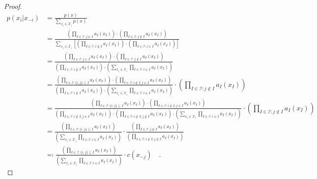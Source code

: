 \documentclass{article}
\theoremstyle{plain}
\begin{document}
\begin{proof}
    \begin{align*}
        p(x_i | x_{-i}) &= \frac{p(x)}{\sum\limits_{x_i \in \mathcal{X}_i}p(x)} \\
        &= \frac{\left(\prod\limits_{I \in \mathcal{I}: j \in I} a_I(x_I)\right) \cdot \left(\prod\limits_{I \in \mathcal{I}: j \not\in I} a_I(x_I)\right)}{\sum\limits_{x_i \in \mathcal{X}_i} \left[\left(\prod\limits_{I \in \mathcal{I}: i \not\in I} a_I(x_I)\right) \cdot \left(\prod\limits_{I \in \mathcal{I}: i \in I} a_I(x_I)\right)\right]} \\
        &= \frac{\left(\prod\limits_{I \in \mathcal{I}: j \in I} a_I(x_I)\right) \cdot \left(\prod\limits_{I \in \mathcal{I}: j \not\in I} a_I(x_I)\right)}{\left(\prod\limits_{I \in \mathcal{I}: i \not\in I} a_I(x_I)\right) \cdot \left(\sum\limits_{x_i \in \mathcal{X}_i}\prod\limits_{I \in \mathcal{I}: i \in I} a_I(x_I)\right)} \\
        &= \frac{\left(\prod\limits_{I \in \mathcal{I}: \{i,j\} \subseteq I} a_I(x_I)\right) \cdot \left(\prod\limits_{I \in \mathcal{I}: i \not\in I, j \in I} a_I(x_I)\right)}{\left(\prod\limits_{I \in \mathcal{I}: i \not\in I} a_I(x_I)\right) \cdot \left(\sum\limits_{x_i \in \mathcal{X}_i}\prod\limits_{I \in \mathcal{I}: i \in I} a_I(x_I)\right)} \cdot \left(\prod\limits_{I \in \mathcal{I}: j \not\in I} a_I(x_I)\right) \\
        &= \frac{\left(\prod\limits_{I \in \mathcal{I}: \{i,j\} \subseteq I} a_I(x_I)\right) \cdot \left(\prod\limits_{I \in \mathcal{I}: i \not\in I, j \in I} a_I(x_I)\right)}{\left(\prod\limits_{I \in \mathcal{I}: i \not\in I, j \in I} a_I(x_I)\right) \cdot \left(\prod\limits_{I \in \mathcal{I}: i \not\in I, j \not\in I} a_I(x_I)\right) \cdot \left(\sum\limits_{x_i \in \mathcal{X}_i}\prod\limits_{I \in \mathcal{I}: i \in I} a_I(x_I)\right)} \cdot \left(\prod\limits_{I \in \mathcal{I}: j \not\in I} a_I(x_I)\right) \\
        &= \frac{\left(\prod\limits_{I \in \mathcal{I}: \{i,j\} \subseteq I} a_I(x_I)\right)}{\left(\sum\limits_{x_i \in \mathcal{X}_i}\prod\limits_{I \in \mathcal{I}: i \in I} a_I(x_I)\right)} \cdot \frac{\left(\prod\limits_{I \in \mathcal{I}: j \not\in I} a_I(x_I)\right)}{\left(\prod\limits_{I \in \mathcal{I}: i \not\in I, j \not\in I} a_I(x_I)\right)} \\
        &\eqqcolon \frac{\left(\prod\limits_{I \in \mathcal{I}: \{i,j\} \subseteq I} a_I(x_I)\right)}{\left(\sum\limits_{x_i \in \mathcal{X}_i}\prod\limits_{I \in \mathcal{I}: i \in I} a_I(x_I)\right)} \cdot c(x_{-j}) \quad .
    \end{align*}


\end{proof}
\end{document}
